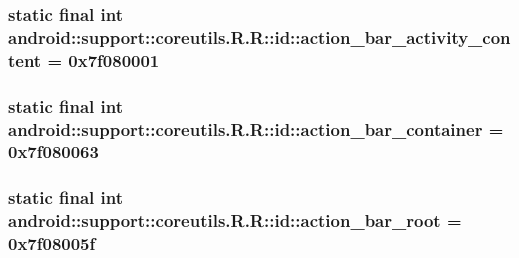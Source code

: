 \hypertarget{classandroid_1_1support_1_1coreutils_1_1_r_1_1id_7af936b8614e04780230ea264adedb24}{
\subsubsection[{action\_\-bar\_\-activity\_\-content}]{\setlength{\rightskip}{0pt plus 5cm}static final int android::support::coreutils.R.R::id::action\_\-bar\_\-activity\_\-content = 0x7f080001}}
\label{classandroid_1_1support_1_1coreutils_1_1_r_1_1id_7af936b8614e04780230ea264adedb24}


\hypertarget{classandroid_1_1support_1_1coreutils_1_1_r_1_1id_42e29ad55e5659b2f6ad65ab5d6559d1}{
\subsubsection[{action\_\-bar\_\-container}]{\setlength{\rightskip}{0pt plus 5cm}static final int android::support::coreutils.R.R::id::action\_\-bar\_\-container = 0x7f080063}}
\label{classandroid_1_1support_1_1coreutils_1_1_r_1_1id_42e29ad55e5659b2f6ad65ab5d6559d1}


\hypertarget{classandroid_1_1support_1_1coreutils_1_1_r_1_1id_cdc29d37a9c51fc091d16ff5f6479008}{
\subsubsection[{action\_\-bar\_\-root}]{\setlength{\rightskip}{0pt plus 5cm}static final int android::support::coreutils.R.R::id::action\_\-bar\_\-root = 0x7f08005f}}
\label{classandroid_1_1support_1_1coreutils_1_1_r_1_1id_cdc29d37a9c51fc091d16ff5f6479008}


